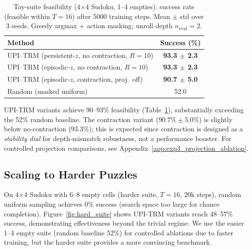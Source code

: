 \documentclass{article}
\theoremstyle{plain}
\theoremstyle{definition}
\theoremstyle{remark}
\begin{document}
{\begin{table}[t]
\caption{Toy-suite feasibility (4$\times$4 Sudoku, 1--4 empties): success rate (feasible within $T{=}16$) after 5000 training steps. Mean $\pm$ std over 3 seeds. Greedy argmax + action masking; unroll depth $n_\mathrm{eval}{=}2$.}
\label{tab:upi_success_only}
\centering
\small
\begin{tabular*}{\columnwidth}{@{\extracolsep{\fill}}lc@{}}
\toprule
Method & Success (\%) \\
\midrule
UPI--TRM (persistent-$z$, no contraction, $R{=}10$) & \textbf{93.3 $\pm$ 2.3} \\
UPI--TRM (episodic-$z$, no contraction, $R{=}10$) & \textbf{93.3 $\pm$ 2.3} \\
UPI--TRM (episodic-$z$, contraction, proj.\ off) & \textbf{90.7 $\pm$ 5.0} \\
Random (masked uniform) & 52.0 \\
\bottomrule
\end{tabular*}
\end{table}

UPI-TRM variants achieve 90--93\% feasibility (Table~\ref{tab:upi_success_only}), substantially exceeding the 52\% random baseline.
The contraction variant ($90.7\%\pm 5.0\%$) is slightly below no-contraction ($93.3\%$); this is expected since contraction is designed as a \emph{stability dial} for depth-mismatch robustness, not a performance booster.
For controlled projection comparisons, see Appendix~\ref{app:exp3_projection_ablation}.

\subsection{Scaling to Harder Puzzles}
\label{sec:harder_puzzles}

On 4$\times$4 Sudoku with 6--8 empty cells (harder suite, $T{=}16$, 20k steps), random uniform sampling achieves 0\% success (search space too large for chance completion). Figure~\ref{fig:hard_suite} shows UPI-TRM variants reach 48--57\% success, demonstrating effectiveness beyond the trivial regime. We use the easier 1--4 empty suite (random baseline 52\%) for controlled ablations due to faster training, but the harder suite provides a more convincing benchmark.

}
\end{document}
